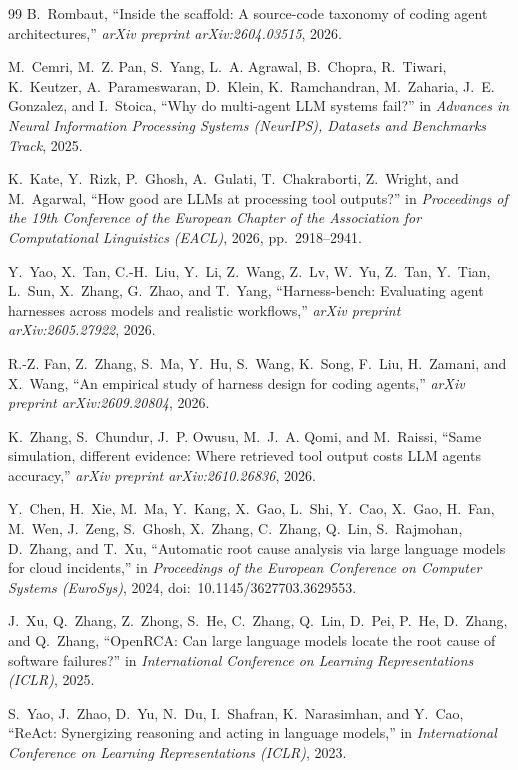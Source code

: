 \documentclass[10pt,conference]{IEEEtran}
\begin{document}
\begin{thebibliography}{99}
B.~Rombaut, ``Inside the scaffold: A source-code taxonomy of coding agent
architectures,'' \emph{arXiv preprint arXiv:2604.03515}, 2026.

M.~Cemri, M.~Z. Pan, S.~Yang, L.~A. Agrawal, B.~Chopra, R.~Tiwari,
K.~Keutzer, A.~Parameswaran, D.~Klein, K.~Ramchandran, M.~Zaharia,
J.~E. Gonzalez, and I.~Stoica, ``Why do multi-agent {LLM} systems fail?'' in
\emph{Advances in Neural Information Processing Systems (NeurIPS), Datasets
and Benchmarks Track}, 2025.

K.~Kate, Y.~Rizk, P.~Ghosh, A.~Gulati, T.~Chakraborti, Z.~Wright, and
M.~Agarwal, ``How good are {LLMs} at processing tool outputs?'' in
\emph{Proceedings of the 19th Conference of the European Chapter of the
Association for Computational Linguistics (EACL)}, 2026, pp.~2918--2941.

Y.~Yao, X.~Tan, C.-H.~Liu, Y.~Li, Z.~Wang, Z.~Lv, W.~Yu, Z.~Tan, Y.~Tian,
L.~Sun, X.~Zhang, G.~Zhao, and T.~Yang, ``Harness-bench: Evaluating agent
harnesses across models and realistic workflows,'' \emph{arXiv preprint
arXiv:2605.27922}, 2026.

R.-Z. Fan, Z.~Zhang, S.~Ma, Y.~Hu, S.~Wang, K.~Song, F.~Liu, H.~Zamani,
and X.~Wang, ``An empirical study of harness design for coding agents,''
\emph{arXiv preprint arXiv:2609.20804}, 2026.

K.~Zhang, S.~Chundur, J.~P. Owusu, M.~J.~A. Qomi, and M.~Raissi, ``Same
simulation, different evidence: Where retrieved tool output costs {LLM}
agents accuracy,'' \emph{arXiv preprint arXiv:2610.26836}, 2026.

Y.~Chen, H.~Xie, M.~Ma, Y.~Kang, X.~Gao, L.~Shi, Y.~Cao, X.~Gao, H.~Fan,
M.~Wen, J.~Zeng, S.~Ghosh, X.~Zhang, C.~Zhang, Q.~Lin, S.~Rajmohan,
D.~Zhang, and T.~Xu, ``Automatic root cause analysis via large language
models for cloud incidents,'' in \emph{Proceedings of the European
Conference on Computer Systems (EuroSys)}, 2024,
doi:~10.1145/3627703.3629553.

J.~Xu, Q.~Zhang, Z.~Zhong, S.~He, C.~Zhang, Q.~Lin, D.~Pei, P.~He,
D.~Zhang, and Q.~Zhang, ``{OpenRCA}: Can large language models locate the
root cause of software failures?'' in \emph{International Conference on
Learning Representations (ICLR)}, 2025.

S.~Yao, J.~Zhao, D.~Yu, N.~Du, I.~Shafran, K.~Narasimhan, and Y.~Cao,
``{ReAct}: Synergizing reasoning and acting in language models,'' in
\emph{International Conference on Learning Representations (ICLR)}, 2023.


\end{thebibliography}
\end{document}
